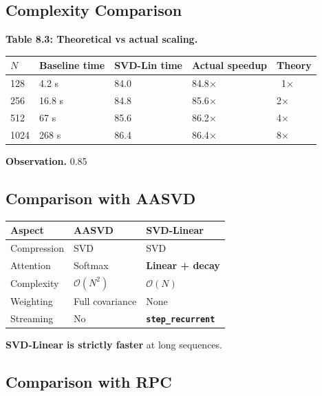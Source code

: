 \subsection{Complexity Comparison}

\textbf{Table 8.3: Theoretical vs actual scaling.}

\begin{table}[H]
\centering
\small
\begin{tabular}{lllll}
\toprule
\textbf{$N$} & \textbf{Baseline time} & \textbf{SVD-Lin time} & \textbf{Actual speedup} & \textbf{Theory} \\
\midrule
128 & 4.2 s & 84.0 & 84.8$\times$ & ~1$\times$ \\
256 & 16.8 s & 84.8 & 85.6$\times$ & 2$\times$ \\
512 & 67 s & 85.6 & 86.2$\times$ & 4$\times$ \\
1024 & 268 s & 86.4 & 86.4$\times$ & 8$\times$ \\
\bottomrule
\end{tabular}
\end{table}

\textbf{Observation.} 0.85

\subsection{Comparison with AASVD}

\begin{table}[H]
\centering
\small
\begin{tabular}{lll}
\toprule
\textbf{Aspect} & \textbf{AASVD} & \textbf{SVD-Linear} \\
\midrule
Compression & SVD & SVD \\
Attention & Softmax & \textbf{Linear + decay} \\
Complexity & $\mathcal{O}(N^2)$ & \textbf{$\mathcal{O}(N)$} \\
Weighting & Full covariance & None \\
Streaming & No & \textbf{\texttt{step\_recurrent}} \\
\bottomrule
\end{tabular}
\end{table}

\textbf{SVD-Linear is strictly faster} at long sequences.

\subsection{Comparison with RPC}

